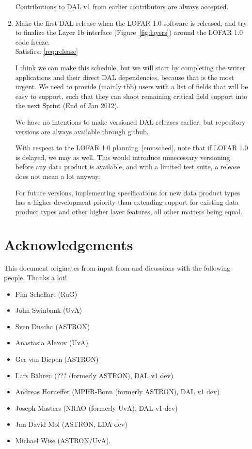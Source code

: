 \documentclass[a4paper,11pt]{article}
\begin{document}
\begin{enumerate}[resume, label=\it D.\arabic{*}]
Contributions to DAL v1 from earlier contributors are always accepted.

\item \label{dsg:release} Make the first DAL release when the LOFAR 1.0 software is released, and try to finalize the Layer 1b interface (Figure~\ref{fig:layers}) around the LOFAR 1.0 code freeze.\\
Satisfies: \ref{req:release}

I think we can make this schedule, but we will start by completing the writer applications and their direct DAL dependencies, because that is the most urgent.
We need to provide (mainly tbb) users with a list of fields that will be easy to support, such that they can shoot remaining critical field support into the next Sprint (End of Jan 2012).

We have no intentions to make versioned DAL releases earlier, but repository versions are always available through github.

With respect to the LOFAR 1.0 planning~\ref{env:sched}, note that if LOFAR 1.0 is delayed, we may as well.
This would introduce unnecessary versioning before any data product is available, and with a limited test suite, a release does not mean a lot anyway.

For future versions, implementing specifications for new data product types has a higher development priority than extending support for existing data product types and other higher layer features, all other matters being equal.

\end{enumerate}


\section{Acknowledgements} \label{sec:acks}
This document originates from input from and dicussions with the following people. Thanks a lot!
\begin{itemize}
\itemsep0em
\item Pim Schellart (RuG)
\item John Swinbank (UvA)
\item Sven Duscha (ASTRON)
\item Anastasia Alexov (UvA)
\item Ger van Diepen (ASTRON)
\item Lars B\"ahren (??? (formerly ASTRON), DAL v1 dev)
\item Andreas Horneffer (MPIfR-Bonn (formerly ASTRON), DAL v1 dev)
\item Joseph Masters (NRAO (formerly UvA), DAL v1 dev)
\item Jan David Mol (ASTRON, LDA dev)
\item Michael Wise (ASTRON/UvA).
\end{itemize}
\end{document}
